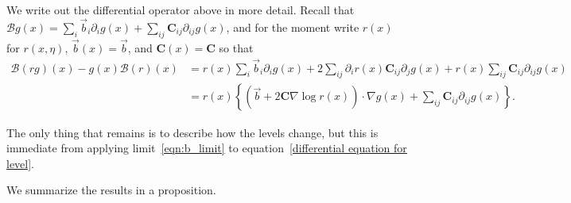 \documentclass[EJP]{ejpecp} %
\newcommand{\grad}{\nabla}
\newcommand{\DG}{\mathcal{B}}  %
\newcommand{\meanq}{\vec b}    %
\newcommand{\covq}{\mathbf{C}}     %
\begin{document}
We write out the differential operator above in more detail.
Recall that $\DG g(x) = \sum_i \meanq_i \partial_i g(x) + \sum_{ij} \covq_{ij} \partial_{ij} g(x)$,
and for the moment write $r(x)$ for $r(x, \eta)$, $\meanq(x) = \meanq$, and $\covq(x) = \covq$
so that
\begin{align}
\DG(rg)(x) - g(x) \DG(r)(x)
    &= \nonumber
    r(x) \sum_i \meanq_i \partial_i g(x)
    + 2 \sum_{ij} \partial_i r(x) \covq_{ij} \partial_j g(x)
    + r(x) \sum_{ij} \covq_{ij} \partial_{ij} g(x) \\
    &= \label{eqn:limiting_generator}
    r(x) \left\{
        \left(
        \meanq
        + 2 \covq \grad \log r(x)
        \right)
        \cdot
        \grad g(x)
        +
        \sum_{ij} \covq_{ij} \partial_{ij} g(x)
    \right\} .
\end{align}

The only thing that remains is to describe how the levels change,
but this is immediate from applying limit~\eqref{eqn:b_limit}
to equation~\eqref{differential equation for level}.

We summarize the results in a proposition.
\end{document}

